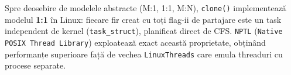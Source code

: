 \documentclass[11pt]{article}
\begin{document}
Spre deosebire de modelele abstracte (M:1, 1:1, M:N), \texttt{clone()} implementează modelul \textbf{1:1} în Linux: fiecare fir creat cu toți flag-ii de partajare este un task independent de kernel (\texttt{task\_struct}), planificat direct de CFS. \texttt{NPTL} (\texttt{Native POSIX Thread Library}) exploatează exact această proprietate, obținând performanțe superioare față de vechea \texttt{LinuxThreads} care emula threaduri cu procese separate.
\end{document}
